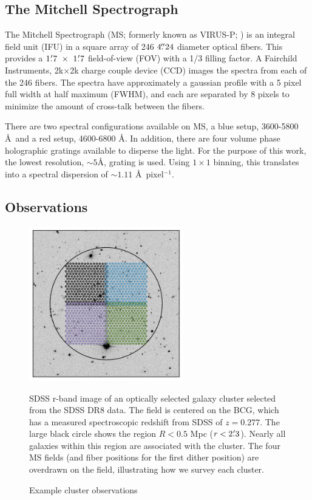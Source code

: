 \subsection{The Mitchell Spectrograph} 
The Mitchell Spectrograph (MS; formerly known as VIRUS-P; \citealt{Hill2008a}) is an integral field unit (IFU) in a square array of 246 $4\mbox{\ensuremath{.\!\!^{\prime\prime}}}24$ diameter optical fibers. This provides a $1\mbox{\ensuremath{.\mkern-4mu^\prime}}7~\times~1\mbox{\ensuremath{.\mkern-4mu^\prime}}7$ field-of-view (FOV) with a 1/3 filling factor. A Fairchild Instruments, 2k$\times$2k charge couple device (CCD) images the spectra from each of the 246 fibers. The spectra have approximately a gaussian profile with a 5 pixel full width at half maximum (FWHM), and each are separated by 8 pixels to minimize the amount of cross-talk between the fibers. 

There are two spectral configurations available on MS, a blue setup, 3600-5800 \AA\ and a red setup, 4600-6800 \AA. In addition, there are four volume phase holographic gratings available to disperse the light. For the purpose of this work, the lowest resolution, $\sim5$\AA, grating is used. Using $1\times1$ binning, this translates into a spectral dispersion of $\sim1.11$ \AA\ pixel$^{-1}$. 

\subsection{Observations} 
\begin{figure}[t]
	\begin{center}
		\includegraphics[width=0.6\textwidth]{./figures2/pointing.pdf} 
	\end{center}
	\caption{Example cluster observations}
	SDSS r-band image of an optically selected galaxy cluster selected from the SDSS DR8 data. The field is centered on the BCG, which has a measured spectroscopic redshift from SDSS of $z = 0.277$. The large black circle shows the region $R<0.5$ Mpc ($r<2\mbox{\ensuremath{.\mkern-4mu^\prime}}3$). Nearly all galaxies within this region are associated with the cluster. The four MS fields (and fiber positions for the first dither position) are overdrawn on the field, illustrating how we survey each cluster. \label{2fig:tiles} 
\end{figure}


